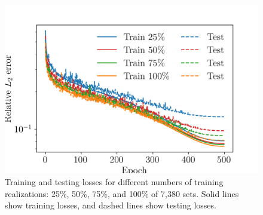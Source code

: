 \documentclass[draft]{agujournal2019}
\begin{document}
\begin{figure}
    \centering
    \includegraphics[width=0.7\linewidth]{loss_numdata_2.png}
    \caption{\label{fig:loss_numdata} Training and testing losses for different numbers of training realizations: 25\%, 50\%, 75\%, and 100\% of 7,380 sets. Solid lines show training losses, and dashed lines show testing losses.}
\end{figure}



\end{document}
